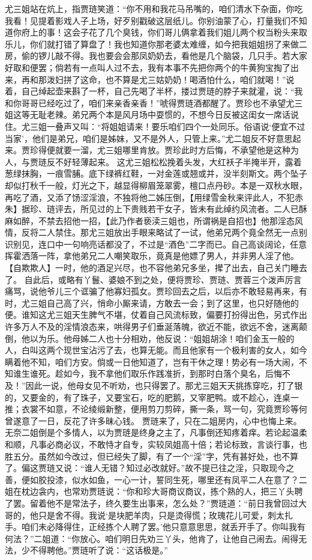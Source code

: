 \documentclass[12pt,oneside]{book}
\begin{document}
尤三姐站在炕上，指贾琏笑道：“你不用和我花马吊嘴的，咱们清水下杂面，你吃我看！见提着影戏人子上场，好歹别戳破这层纸儿。你别油蒙了心，打量我们不知道你府上的事！这会子花了几个臭钱，你们哥儿俩拿着我们姐儿两个权当粉头来取乐儿，你们就打错了算盘了！我也知道你那老婆太难缠，如今把我姐姐拐了来做二房，偷的锣儿敲不得。我也要会会那凤奶奶去，看他是几个脑袋，几只手。若大家好取和便罢；倘若有一点叫人过不去，我有本事不先把你两个的牛黄狗宝掏了出来，再和那泼妇拼了这命，也不算是尤三姑奶奶！喝酒怕什么，咱们就喝！”说着，自己绰起壶来斟了一杯，自己先喝了半杯，搂过贾琏的脖子来就灌，说：“我和你哥哥已经吃过了，咱们来亲香亲香！”唬得贾琏酒都醒了。贾珍也不承望尤三姐这等无耻老辣。弟兄两个本是风月场中耍惯的，不想今日反被这闺女一席话说住。尤三姐一叠声又叫：“将姐姐请来！要乐咱们四个一处同乐。俗语说‘便宜不过当家’，他们是弟兄，咱们是姊妹，又不是外人，只管上来。”尤二姐反不好意思起来。贾珍得便就要一溜，尤三姐哪里肯放。贾珍此时方后悔，不承望他是这种为人，与贾琏反不好轻薄起来。
这尤三姐松松挽着头发，大红袄子半掩半开，露着葱绿抹胸，一痕雪脯。底下绿裤红鞋，一对金莲或翘或并，没半刻斯文。两个坠子却似打秋千一般，灯光之下，越显得柳眉笼翠雾，檀口点丹砂。本是一双秋水眼，再吃了酒，又添了饧涩淫浪，不独将他二姊压倒，【用绿雪金秋来评此人，不犯赤朱】据珍、琏评去，所见过的上下贵贱若干女子，皆未有此绰约风流者。二人已酥麻如醉，不禁去招他一招，【此乃作者亵渎三姐也，所谓祸是自招也】他那淫态风情，反将二人禁住。那尤三姐放出手眼来略试了一试，他弟兄两个竟全然无一点别识别见，连口中一句响亮话都没了，不过是“酒色”二字而已。自己高谈阔论，任意挥霍洒落一阵，拿他弟兄二人嘲笑取乐，竟真是他嫖了男人，并非男人淫了他。【自欺欺人】一时，他的酒足兴尽，也不容他弟兄多坐，撵了出去，自己关门睡去了。
自此后，或略有丫鬟、婆娘不到之处，便将贾珍、贾琏、贾蓉三个泼声厉言痛骂，说他爷儿三个诓骗了他寡妇孤女。贾珍回去之后，以后亦不敢轻易再来，有时，尤三姐自己高了兴，悄命小厮来请，方敢去一会；到了这里，也只好随他的便。谁知这尤三姐天生脾气不堪，仗着自己风流标致，偏要打扮得出色，另式作出许多万人不及的淫情浪态来，哄得男子们垂涎落魄，欲近不能，欲远不舍，迷离颠倒，他以为乐。他母姊二人也十分相劝，他反说：“姐姐胡涂！咱们金玉一般的人，白叫这两个现世宝沾污了去，也算无能。而且他家有一个极利害的女人，如今瞒着他不知，咱们方安。倘或一日他知道了，岂有干休之理！势必有一场大闹，不知谁生谁死。趁如今，我不拿他们取乐作践准折，到那时白落个臭名，后悔不及！”因此一说，他母女见不听劝，也只得罢了。那尤三姐天天挑拣穿吃，打了银的，又要金的，有了珠子，又要宝石，吃的肥鹅，又宰肥鸭。或不趁心，连桌一推；衣裳不如意，不论绫缎新整，便用剪刀剪碎，撕一条，骂一句，究竟贾珍等何曾遂意了一日，反花了许多昧心钱。
贾琏来了，只在二姐房内，心中也悔上来。无奈二姐倒是个多情人，以为贾琏是终身之主了，凡事倒还知疼着痒。若论起温柔和顺，凡事必商必议，不敢恃才自专，实较凤姐高十倍；若论标致，言谈行事，也胜五分。虽然如今改过，但已经失了脚，有了一个“淫”字，凭有甚好处，也不算了。偏这贾琏又说：“谁人无错？知过必改就好。”故不提已往之淫，只取现今之善，便如胶投漆，似水如鱼，一心一计，誓同生死，哪里还有凤平二人在意了？二姐在枕边衾内，也常劝贾琏说：“你和珍大哥商议商议，拣个熟的人，把三丫头聘了罢。留着他不是常法子，终久要生出事来，怎么处？”贾琏道：“前日我曾回过大哥的，他只是舍不得。我说‘是块肥羊肉，只是烫得慌；玫瑰花儿可爱，刺太扎手。咱们未必降得住，正经拣个人聘了罢。’他只意意思思，就丢开手了。你叫我有何法？”二姐道：“你放心。咱们明日先劝三丫头，他肯了，让他自己闹去。闹得无法，少不得聘他。”贾琏听了说：“这话极是。”
\end{document}

